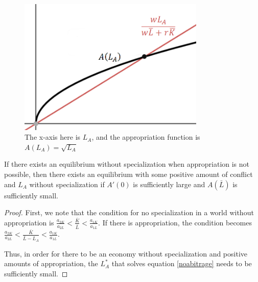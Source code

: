 \begin{figure}[H]\label{fg:equi}
    \centering
    \caption{The x-axis here is $L_A$, and the appropriation function is $A(L_A)= \sqrt{L_A}$}
    \includegraphics[width = 3.5in]{chapters/Conflict Equilibrium.png}
\end{figure}

\begin{proposition}
    If there exists an equilibrium without specialization when appropriation is not possible, then there exists an equilibrium with some positive amount of conflict and $L_A$ without specialization if $A'(0)$ is sufficiently large and $A(\bar{L})$ is sufficiently small.
\end{proposition}
\begin{proof}
    First, we note that the condition for no specialization in a world without appropriation is $\frac{a_{2K}}{a_{2L}} < \frac{\bar{K}}{\bar{L}} < \frac{a_{1K}}{a_{1L}}$. If there is appropriation, the condition becomes $\frac{a_{2K}}{a_{2L}} < \frac{\bar{K}}{\bar{L} - L_A} < \frac{a_{1K}}{a_{1L}}$. 

    Thus, in order for there to be an economy without specialization and positive amounts of appropriation, the $L_A^*$ that solves equation \ref{noabitrage} needs to be sufficiently small.
\end{proof}
